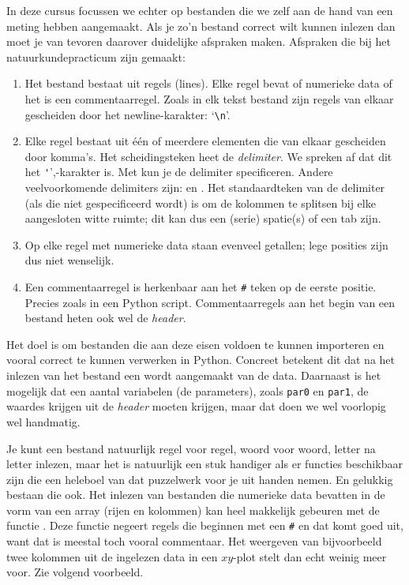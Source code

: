 \documentclass[a4paper,11pt, fleqn]{article}
\begin{document}
In deze cursus focussen we echter op bestanden die we zelf aan de hand van een meting hebben aangemaakt. Als je zo'n bestand correct wilt kunnen inlezen dan moet je van tevoren daarover duidelijke afspraken maken. Afspraken die bij het natuurkundepracticum zijn gemaakt:
\begin{enumerate}
\item Het bestand bestaat uit regels (lines). Elke regel bevat of numerieke data of het is een commentaarregel. Zoals in elk tekst bestand zijn regels van elkaar gescheiden door het newline-karakter: `\verb,\n,'.
\item Elke regel bestaat uit \'e\'en of meerdere elementen die van elkaar gescheiden door komma's. Het scheidingsteken heet de \textit{delimiter}. We spreken af dat dit het \verb,',',-karakter is. Met  kun je de delimiter specificeren. Andere veelvoorkomende delimiters zijn:  en . Het standaardteken van de delimiter (als die niet gespecificeerd wordt) is om de kolommen te splitsen bij elke aangesloten witte ruimte; dit kan dus een (serie) spatie(s) of een tab zijn.
\item Op elke regel met numerieke data staan evenveel getallen; lege posities zijn dus niet wenselijk.
\item Een commentaarregel is herkenbaar aan het \verb,#, teken op de eerste positie. Precies zoals in een Python script. Commentaarregels aan het begin van een bestand heten ook wel de {\it header}.
\end{enumerate}

Het doel is om bestanden die aan deze eisen voldoen te kunnen importeren en vooral correct te kunnen verwerken in Python. Concreet betekent dit dat na het inlezen van het bestand een  wordt aangemaakt van de data. Daarnaast is het mogelijk dat een aantal variabelen (de parameters), zoals \verb.par0. en \verb.par1., de waardes krijgen uit de \textit{header} moeten krijgen, maar dat doen we wel voorlopig wel handmatig.

Je kunt een bestand natuurlijk regel voor regel, woord voor woord, letter na letter inlezen, maar het is natuurlijk een stuk handiger als er functies beschikbaar zijn die een heleboel van dat puzzelwerk voor je uit handen nemen. En gelukkig bestaan die ook. 
Het inlezen van bestanden die numerieke data bevatten in de vorm van een array (rijen en kolommen) kan heel makkelijk gebeuren met de  functie . Deze functie negeert regels die beginnen met een \verb,#, en dat komt goed uit, want dat is meestal toch vooral commentaar. Het weergeven van bijvoorbeeld twee kolommen uit de ingelezen data in een $xy$-plot stelt dan echt weinig meer voor. Zie volgend voorbeeld.
 
\end{document}

